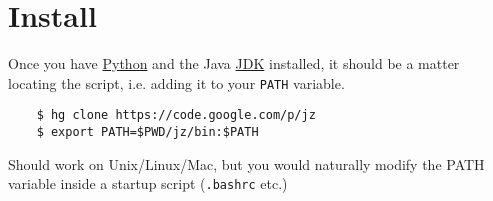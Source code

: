 
\section{ Install }

Once you have  \href{http://python.org}{Python} and the Java
 \href{http:openjdk.java.net}{JDK} installed, it should be a matter
locating the script, i.e. adding it to your \texttt{PATH} variable.


{\small
\begin{verbatim}
    $ hg clone https://code.google.com/p/jz
    $ export PATH=$PWD/jz/bin:$PATH
\end{verbatim}
}


Should work on Unix/Linux/Mac, but you would naturally modify
the PATH variable inside a startup script (\texttt{.bashrc} etc.)
